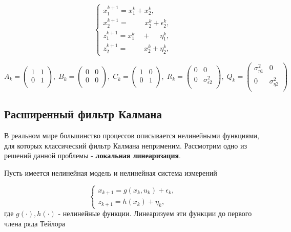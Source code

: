 \documentclass[12pt, a4paper]{article}
\begin{document}
\begin{equation}
\begin{cases}
x^{k+1}_1 = x^{k}_1 + x^{k}_2, \\
x^{k+1}_2 = \quad \quad \;x^{k}_2 + \epsilon^{k}_2, \\
z^{k+1}_1 = x^{k}_1 \quad + \quad \; \eta^{k}_1, \\
z^{k+1}_2 =  \quad \quad \; x^{k}_2 + \eta^{k}_2,
\end{cases}
\end{equation}

\begin{equation}
A_{k} =
\begin{pmatrix}
1 & 1 \\
0 & 1 \\
\end{pmatrix}, \;
B_k = 
\begin{pmatrix}
0 & 0 \\
0 & 0 \\
\end{pmatrix}, \;
C_k = 
\begin{pmatrix}
1 & 0 \\
0 & 1 \\
\end{pmatrix}, \;
R_k = 
\begin{pmatrix}
0 & 0 \\
0 & \sigma_{\epsilon 2}^2 \\
\end{pmatrix}, \;
Q_k = 
\begin{pmatrix}
\sigma_{\eta 1}^2 & 0 \\
0 & \sigma_{\eta 2}^2 \\
\end{pmatrix}
\end{equation}



\newpage
\subsection*{Расширенный фильтр Калмана}

В реальном мире большинство процессов описывается нелинейными функциями, для которых классический фильтр Калмана неприменим. Рассмотрим одно из решений данной проблемы - \textbf{локальная линеаризация}.

Пусть имеется нелинейная модель и нелинейная система измерений

\begin{equation}
\begin{cases}
x_{k+1} = g(x_k, u_k) + \epsilon_k, \\
z_{k+1} = h(x_k) + \eta_k,
\end{cases}
\end{equation} 
где $g(\cdot), h(\cdot)$ - нелинейные функции. Линеаризуем эти функции до первого члена ряда Тейлора
\end{document}
